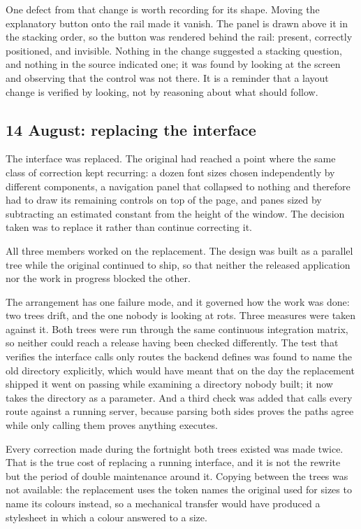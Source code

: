 \documentclass[11pt,a4paper]{article}
\begin{document}
One defect from that change is worth recording for its shape. Moving the
explanatory button onto the rail made it vanish. The panel is drawn above it in
the stacking order, so the button was rendered behind the rail: present,
correctly positioned, and invisible. Nothing in the change suggested a stacking
question, and nothing in the source indicated one; it was found by looking at
the screen and observing that the control was not there. It is a reminder that
a layout change is verified by looking, not by reasoning about what should
follow.

\subsection{14 August: replacing the interface}

The interface was replaced. The original had reached a point where the same
class of correction kept recurring: a dozen font sizes chosen independently by
different components, a navigation panel that collapsed to nothing and
therefore had to draw its remaining controls on top of the page, and panes
sized by subtracting an estimated constant from the height of the window. The
decision taken was to replace it rather than continue correcting it.

All three members worked on the replacement. The design was built as a
parallel tree while the original continued to ship, so that neither the
released application nor the work in progress blocked the other.

The arrangement has one failure mode, and it governed how the work was done: two
trees drift, and the one nobody is looking at rots. Three measures were taken
against it. Both trees were run through the same continuous integration matrix,
so neither could reach a release having been checked differently. The test that
verifies the interface calls only routes the backend defines was found to name
the old directory explicitly, which would have meant that on the day the
replacement shipped it went on passing while examining a directory nobody
built; it now takes the directory as a parameter. And a third check was added
that calls every route against a running server, because parsing both sides
proves the paths agree while only calling them proves anything executes.

Every correction made during the fortnight both trees existed was made twice.
That is the true cost of replacing a running interface, and it is not the
rewrite but the period of double maintenance around it. Copying between the
trees was not available: the replacement uses the token names the original used
for sizes to name its colours instead, so a mechanical transfer would have
produced a stylesheet in which a colour answered to a size.
\end{document}
